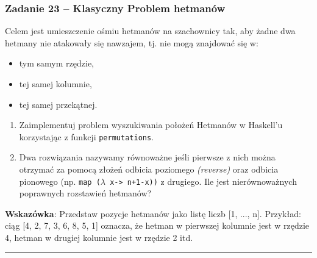 \documentclass[11pt,a4paper]{article}
\begin{document}
\subsubsection{Zadanie 23 -- Klasyczny Problem hetmanów}
Celem jest umieszczenie ośmiu hetmanów na szachownicy tak, aby żadne dwa hetmany nie atakowały się nawzajem, tj. nie mogą znajdować się w:
\begin{itemize}
    \item tym samym rzędzie,
    \item tej samej kolumnie,
    \item tej samej przekątnej.
\end{itemize}
\begin{enumerate}
    \item Zaimplementuj problem wyszukiwania położeń Hetmanów w Haskell’u korzystając z funkcji \texttt{permutations}.
    \item Dwa rozwiązania nazywamy równoważne jeśli pierwsze z nich można otrzymać za pomocą złożeń odbicia poziomego \textit{(reverse)} oraz odbicia pionowego (np. \texttt{map ($\lambda$ x-> n+1-x))} z drugiego. Ile jest nierównoważnych poprawnych rozstawień hetmanów?
\end{enumerate}
\textbf{Wskazówka}: Przedstaw pozycje hetmanów jako listę liczb [1, ..., n]. Przykład: ciąg [4, 2, 7, 3, 6, 8, 5, 1] oznacza, że hetman w pierwszej kolumnie jest w rzędzie 4, hetman w drugiej kolumnie jest w rzędzie 2 itd.

\bigskip
\hrule
\bigskip
\end{document}
